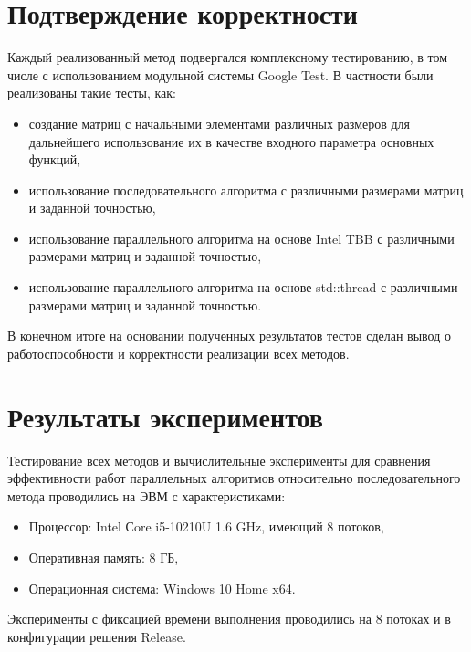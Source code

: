 \documentclass{report}
\begin{document}
\section*{Подтверждение корректности}
\par Каждый реализованный метод подвергался комплексному тестированию, в том числе с использованием модульной системы Google Test. В частности были реализованы такие тесты, как:
\begin{itemize}
\begin{itemize}
    \item создание матриц с начальными элементами различных размеров для дальнейшего использование их в качестве входного параметра основных функций,
    \item использование последовательного алгоритма с различными размерами матриц и заданной точностью,
    \item использование параллельного алгоритма на основе Intel TBB с различными размерами матриц и заданной точностью,
    \item использование параллельного алгоритма на основе std::thread с различными размерами матриц и заданной точностью.
  \end{itemize}
\end{itemize}
\par В конечном итоге на основании полученных результатов тестов сделан вывод о работоспособности и корректности реализации всех методов.  
\newpage

\section*{Результаты экспериментов}
Тестирование всех методов и вычислительные эксперименты для сравнения эффективности работ параллельных алгоритмов относительно последовательного метода проводились на ЭВМ с характеристиками:
\begin{itemize}
\item Процессор: Intel Сore i5-10210U 1.6 GHz, имеющий 8 потоков,
\item Оперативная память: 8 ГБ,
\item Операционная система: Windows 10 Home x64.
\end{itemize}

\par Эксперименты с фиксацией времени выполнения проводились на 8 потоках и в конфигурации решения Release.
\end{document}

